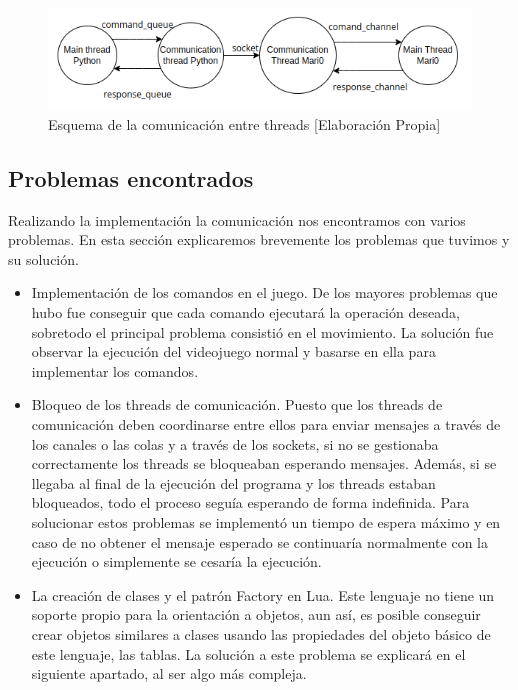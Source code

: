 \begin{figure}[ht]
    \centering
    \includegraphics[width=1.0\textwidth]{img/threads.png}
    \caption{Esquema de la comunicación entre threads [Elaboración Propia]}
    \label{fig:threads}
\end{figure}

\subsection*{Problemas encontrados}

Realizando la implementación la comunicación nos encontramos con varios problemas. En esta sección explicaremos brevemente los problemas que tuvimos y su solución.

\begin{itemize}
    \item Implementación de los comandos en el juego. De los mayores problemas que hubo fue conseguir que cada comando ejecutará la operación deseada, sobretodo el principal problema consistió en el movimiento. La solución fue observar la ejecución del videojuego normal y basarse en ella para implementar los comandos.
    \item Bloqueo de los threads de comunicación. Puesto que los threads de comunicación deben coordinarse entre ellos para enviar mensajes a través de los canales o las colas y a través de los sockets, si no se gestionaba correctamente los threads se bloqueaban esperando mensajes. Además, si se llegaba al final de la ejecución del programa y los threads estaban bloqueados, todo el proceso seguía esperando de forma indefinida. Para solucionar estos problemas se implementó un tiempo de espera máximo y en caso de no obtener el mensaje esperado se continuaría normalmente con la ejecución o simplemente se cesaría la ejecución.
    \item La creación de clases y el patrón Factory en Lua. Este lenguaje no tiene un soporte propio para la orientación a objetos, aun así, es posible conseguir crear objetos similares a clases usando las propiedades del objeto básico de este lenguaje, las tablas. La solución a este problema se explicará en el siguiente apartado, al ser algo más compleja.
\end{itemize}

